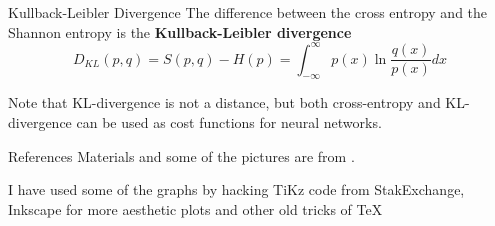 \documentclass{beamer}
\begin{document}
\begin{frame}{Kullback-Leibler Divergence}
	The difference between the cross entropy and the Shannon entropy is the \textbf{Kullback-Leibler divergence}
	\begin{equation*}
		D_{KL}(p,q)= S(p,q)- H(p)= \int_{-\infty}^{\infty} p(x) \ln \frac{q(x)}{p(x)} dx
	\end{equation*}

	Note that KL-divergence is not a distance, but both cross-entropy and KL-divergence can be used as cost functions for neural networks.
\end{frame}

\begin{frame}{References}
	Materials and some of the pictures are from \citep{calin}.
	\printbibliography 	
	
	I have used some of the graphs by hacking TiKz code from StakExchange, Inkscape for more aesthetic plots and other old tricks of \TeX
	
\end{frame}
\end{document}
